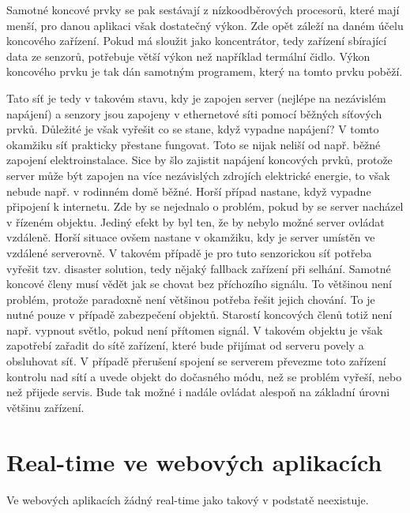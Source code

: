 Samotné koncové prvky se pak sestávají z nízkoodběrových procesorů, které mají menší, pro danou aplikaci však dostatečný výkon. Zde opět záleží na daném účelu koncového zařízení. Pokud má sloužit jako koncentrátor, tedy zařízení sbírající data ze senzorů, potřebuje větší výkon než například termální čidlo. Výkon koncového prvku je tak dán samotným programem, který na tomto prvku poběží.

Tato síť je tedy v takovém stavu, kdy je zapojen server (nejlépe na nezávislém napájení) a senzory jsou zapojeny v ethernetové síti pomocí běžných síťových prvků. Důležité je však vyřešit co se stane, když vypadne napájení? V tomto okamžiku síť prakticky přestane fungovat. Toto se nijak neliší od např. běžné zapojení elektroinstalace. Sice by šlo zajistit napájení koncových prvků, protože server může být zapojen na více nezávislých zdrojích elektrické energie, to však nebude např. v rodinném domě běžné. Horší případ nastane, když vypadne připojení k internetu. Zde by se nejednalo o problém, pokud by se server nacházel v řízeném objektu. Jediný efekt by byl ten, že by nebylo možné server ovládat vzdáleně. Horší situace ovšem nastane v okamžiku, kdy je server umístěn ve vzdálené serverovně. V takovém případě je pro tuto senzorickou síť potřeba vyřešit tzv. disaster solution, tedy nějaký fallback zařízení při selhání. Samotné koncové členy musí vědět jak se chovat bez příchozího signálu. To většinou není problém, protože paradoxně není většinou potřeba řešit jejich chování. To je nutné pouze v případě zabezpečení objektů. Starostí koncových členů totiž není např. vypnout světlo, pokud není přítomen signál. V takovém objektu je však zapotřebí zařadit do sítě zařízení, které bude přijímat od serveru povely a obsluhovat síť. V případě přerušení spojení se serverem převezme toto zařízení kontrolu nad sítí a uvede objekt do dočasného módu, než se problém vyřeší, nebo než přijede servis. Bude tak možné i nadále ovládat alespoň na základní úrovni většinu zařízení.

\section{Real-time ve webových aplikacích}
Ve webových aplikacích žádný real-time jako takový v podstatě neexistuje. 

